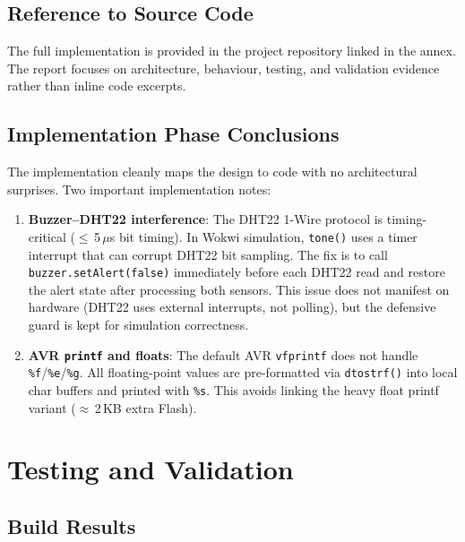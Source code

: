 \documentclass[12pt]{article}
\begin{document}
\subsection{Reference to Source Code}

The full implementation is provided in the project repository linked in the annex. The report focuses on architecture, behaviour, testing, and validation evidence rather than inline code excerpts.

\subsection{Implementation Phase Conclusions}
\hspace{0.8cm} The implementation cleanly maps the design to code with no architectural surprises. Two important implementation notes:

\begin{enumerate}
    \item \textbf{Buzzer--DHT22 interference}: The DHT22 1-Wire protocol is timing-critical ($\leq$\,5\,$\mu$s bit timing). In Wokwi simulation, \texttt{tone()} uses a timer interrupt that can corrupt DHT22 bit sampling. The fix is to call \texttt{buzzer.setAlert(false)} immediately before each DHT22 read and restore the alert state after processing both sensors. This issue does not manifest on hardware (DHT22 uses external interrupts, not polling), but the defensive guard is kept for simulation correctness.
    \item \textbf{AVR \texttt{printf} and floats}: The default AVR \texttt{vfprintf} does not handle \texttt{\%f}/\texttt{\%e}/\texttt{\%g}. All floating-point values are pre-formatted via \texttt{dtostrf()} into local char buffers and printed with \texttt{\%s}. This avoids linking the heavy float printf variant ($\approx$\,2\,KB extra Flash).
\end{enumerate}

\section{Testing and Validation}

\subsection{Build Results}
\end{document}
